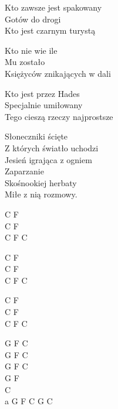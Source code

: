 \begin{textn}
    Kto zawsze jest spakowany\\
    Gotów do drogi\\
    Kto jest czarnym turystą

    Kto nie wie ile\\
    Mu zostało\\
    Księżyców znikających w dali

    Kto jest przez Hades\\
    Specjalnie umiłowany\\
    Tego cieszą rzeczy najprostsze

    Słoneczniki ścięte\\
    Z których światło uchodzi\\
    Jesień igrająca z ogniem\\
    Zaparzanie\\
    Skośnookiej herbaty\\
    Miłe z nią rozmowy.
\end{textn}
\begin{chordw}
    C F\\
    C F\\
    C F C

    C F\\
    C F\\
    C F C

    C F\\
    C F\\
    C F C

    G F C\\
    G F C\\
    G F C\\
    G F\\
    C\\
    a G F C G C
\end{chordw}